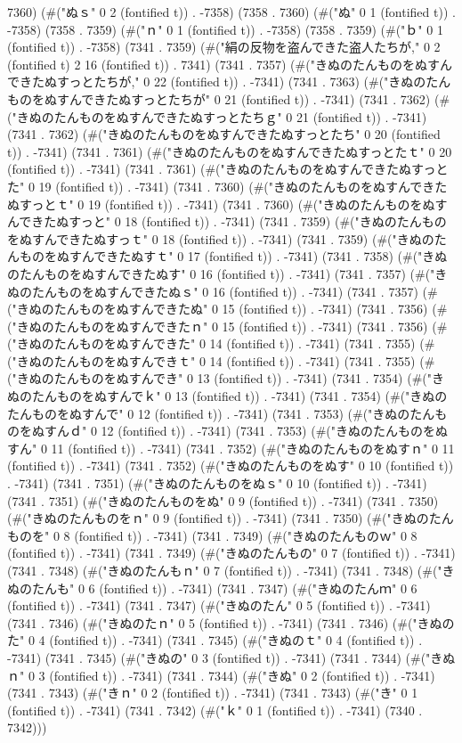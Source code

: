 7360) (#("ぬｓ" 0 2 (fontified t)) . -7358) (7358 . 7360) (#("ぬ" 0 1 (fontified t)) . -7358) (7358 . 7359) (#("ｎ" 0 1 (fontified t)) . -7358) (7358 . 7359) (#("ｂ" 0 1 (fontified t)) . -7358) (7341 . 7359) (#("絹の反物を盗んできた盗人たちが," 0 2 (fontified t) 2 16 (fontified t)) . 7341) (7341 . 7357) (#("きぬのたんものをぬすんできたぬすっとたちが," 0 22 (fontified t)) . -7341) (7341 . 7363) (#("きぬのたんものをぬすんできたぬすっとたちが" 0 21 (fontified t)) . -7341) (7341 . 7362) (#("きぬのたんものをぬすんできたぬすっとたちｇ" 0 21 (fontified t)) . -7341) (7341 . 7362) (#("きぬのたんものをぬすんできたぬすっとたち" 0 20 (fontified t)) . -7341) (7341 . 7361) (#("きぬのたんものをぬすんできたぬすっとたｔ" 0 20 (fontified t)) . -7341) (7341 . 7361) (#("きぬのたんものをぬすんできたぬすっとた" 0 19 (fontified t)) . -7341) (7341 . 7360) (#("きぬのたんものをぬすんできたぬすっとｔ" 0 19 (fontified t)) . -7341) (7341 . 7360) (#("きぬのたんものをぬすんできたぬすっと" 0 18 (fontified t)) . -7341) (7341 . 7359) (#("きぬのたんものをぬすんできたぬすっｔ" 0 18 (fontified t)) . -7341) (7341 . 7359) (#("きぬのたんものをぬすんできたぬすｔ" 0 17 (fontified t)) . -7341) (7341 . 7358) (#("きぬのたんものをぬすんできたぬす" 0 16 (fontified t)) . -7341) (7341 . 7357) (#("きぬのたんものをぬすんできたぬｓ" 0 16 (fontified t)) . -7341) (7341 . 7357) (#("きぬのたんものをぬすんできたぬ" 0 15 (fontified t)) . -7341) (7341 . 7356) (#("きぬのたんものをぬすんできたｎ" 0 15 (fontified t)) . -7341) (7341 . 7356) (#("きぬのたんものをぬすんできた" 0 14 (fontified t)) . -7341) (7341 . 7355) (#("きぬのたんものをぬすんできｔ" 0 14 (fontified t)) . -7341) (7341 . 7355) (#("きぬのたんものをぬすんでき" 0 13 (fontified t)) . -7341) (7341 . 7354) (#("きぬのたんものをぬすんでｋ" 0 13 (fontified t)) . -7341) (7341 . 7354) (#("きぬのたんものをぬすんで" 0 12 (fontified t)) . -7341) (7341 . 7353) (#("きぬのたんものをぬすんｄ" 0 12 (fontified t)) . -7341) (7341 . 7353) (#("きぬのたんものをぬすん" 0 11 (fontified t)) . -7341) (7341 . 7352) (#("きぬのたんものをぬすｎ" 0 11 (fontified t)) . -7341) (7341 . 7352) (#("きぬのたんものをぬす" 0 10 (fontified t)) . -7341) (7341 . 7351) (#("きぬのたんものをぬｓ" 0 10 (fontified t)) . -7341) (7341 . 7351) (#("きぬのたんものをぬ" 0 9 (fontified t)) . -7341) (7341 . 7350) (#("きぬのたんものをｎ" 0 9 (fontified t)) . -7341) (7341 . 7350) (#("きぬのたんものを" 0 8 (fontified t)) . -7341) (7341 . 7349) (#("きぬのたんものｗ" 0 8 (fontified t)) . -7341) (7341 . 7349) (#("きぬのたんもの" 0 7 (fontified t)) . -7341) (7341 . 7348) (#("きぬのたんもｎ" 0 7 (fontified t)) . -7341) (7341 . 7348) (#("きぬのたんも" 0 6 (fontified t)) . -7341) (7341 . 7347) (#("きぬのたんｍ" 0 6 (fontified t)) . -7341) (7341 . 7347) (#("きぬのたん" 0 5 (fontified t)) . -7341) (7341 . 7346) (#("きぬのたｎ" 0 5 (fontified t)) . -7341) (7341 . 7346) (#("きぬのた" 0 4 (fontified t)) . -7341) (7341 . 7345) (#("きぬのｔ" 0 4 (fontified t)) . -7341) (7341 . 7345) (#("きぬの" 0 3 (fontified t)) . -7341) (7341 . 7344) (#("きぬｎ" 0 3 (fontified t)) . -7341) (7341 . 7344) (#("きぬ" 0 2 (fontified t)) . -7341) (7341 . 7343) (#("きｎ" 0 2 (fontified t)) . -7341) (7341 . 7343) (#("き" 0 1 (fontified t)) . -7341) (7341 . 7342) (#("ｋ" 0 1 (fontified t)) . -7341) (7340 . 7342)))
